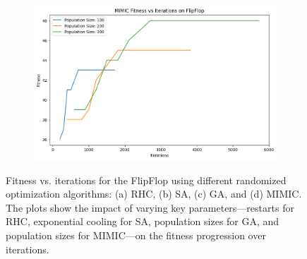 \begin{figure}[htbp]
\begin{subfigure}[b]{0.49\textwidth}
        \caption{}
        \label{fig:flipflopga}
    \end{subfigure}
    \hfill
    \begin{subfigure}[b]{0.49\textwidth}
        \centering
        \includegraphics[width=\textwidth]{image/flipflop/mimic.png}
        \caption{}
        \label{fig:flipflopmimic}
    \end{subfigure}
    \caption{Fitness vs. iterations for the FlipFlop using different randomized optimization algorithms: (a) RHC, (b) SA, (c) GA, and (d) MIMIC. The plots show the impact of varying key parameters—restarts for RHC, exponential cooling for SA, population sizes for GA, and population sizes for MIMIC—on the fitness progression over iterations.}
    \label{fig:flipflopgrid}
\end{figure}

